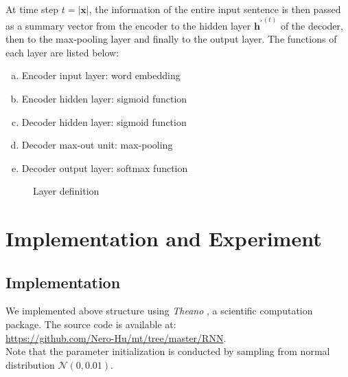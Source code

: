 \documentclass[11pt,letterpaper]{article}
\begin{document}
At time step $t = |\mathbf{x}|$, the information of the entire input sentence is then passed as a summary vector from the encoder to the hidden layer ${\mathbf{h}^\prime}^{(t)}$ of the decoder, then to the max-pooling layer and finally to the output layer.
The functions of each layer are listed below:
\begin{enumerate}[a.]
\item Encoder input layer: word embedding
\item Encoder hidden layer: sigmoid function
\item Decoder hidden layer: sigmoid function
\item Decoder max-out unit: max-pooling
\item Decoder output layer: softmax function
\end{enumerate}

\begin{figure}[H]
	\begin{center}
	\end{center}
	\caption{Layer definition}
\end{figure}

\section{Implementation and Experiment}
\subsection{Implementation} %
\label{sub:theano}
We implemented above structure using \textit{Theano} \cite{theano}, a scientific computation package. The source code is available at:\\
\url{https://github.com/Nero-Hu/mt/tree/master/RNN}.\\
Note that the parameter initialization is conducted by sampling from normal distribution $\mathcal{N}(0,0.01)$.
\end{document}
